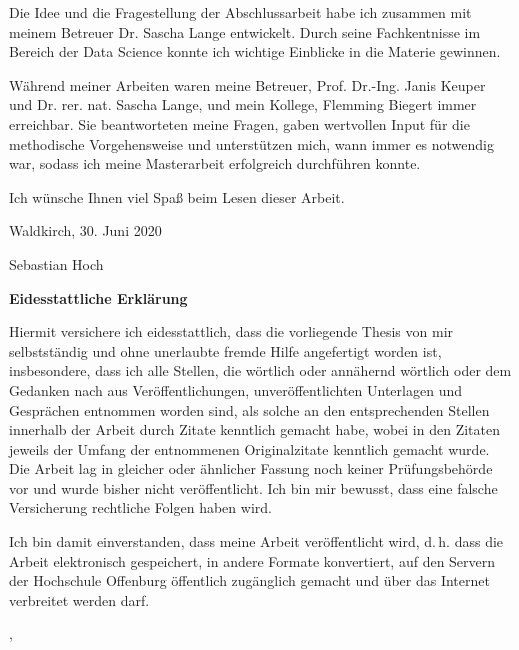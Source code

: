Die Idee und die Fragestellung der Abschlussarbeit habe ich zusammen mit meinem Betreuer Dr. Sascha Lange entwickelt. Durch seine Fachkentnisse im Bereich der Data Science konnte ich wichtige Einblicke in die Materie gewinnen.

Während meiner Arbeiten waren meine Betreuer, Prof. Dr.-Ing. Janis Keuper und Dr. rer. nat. Sascha Lange, und mein Kollege, Flemming Biegert immer erreichbar. Sie beantworteten meine Fragen, gaben wertvollen Input für die methodische Vorgehensweise und unterstützen mich, wann immer es notwendig war, sodass ich meine Masterarbeit erfolgreich durchführen konnte.

Ich wünsche Ihnen viel Spaß beim Lesen dieser Arbeit.

Waldkirch, 30. Juni 2020

Sebastian Hoch 


\clearpage
\thispagestyle{empty}
\textsf{\large\textbf{Eidesstattliche Erklärung}}

Hiermit versichere ich eidesstattlich, dass die vorliegende Thesis von mir selbstständig und ohne unerlaubte fremde Hilfe angefertigt worden ist, insbesondere, dass ich alle Stellen, die wörtlich oder annähernd wörtlich oder dem Gedanken nach aus Veröffentlichungen, unveröffentlichten Unterlagen und Gesprächen entnommen worden sind, als solche an den entsprechenden Stellen innerhalb der Arbeit durch Zitate kenntlich gemacht habe, wobei in den Zitaten jeweils der Umfang der entnommenen Originalzitate kenntlich gemacht wurde. Die Arbeit lag in gleicher oder ähnlicher Fassung noch keiner Prüfungsbehörde vor und wurde bisher nicht veröffentlicht. Ich bin mir bewusst, dass eine falsche Versicherung rechtliche Folgen haben wird.

%
{
\vspace{0.5cm}
Ich bin damit einverstanden, dass meine Arbeit veröffentlicht wird, d.\,h. dass die Arbeit elektronisch gespeichert, in andere Formate konvertiert, auf den Servern der Hochschule Offenburg öffentlich zugänglich gemacht und über das Internet verbreitet werden darf. 
}{}%


\vspace{1cm}
\hsmaort, \hsmadatum \\

\vspace{1.2cm}						                                      
\hsmaautor

